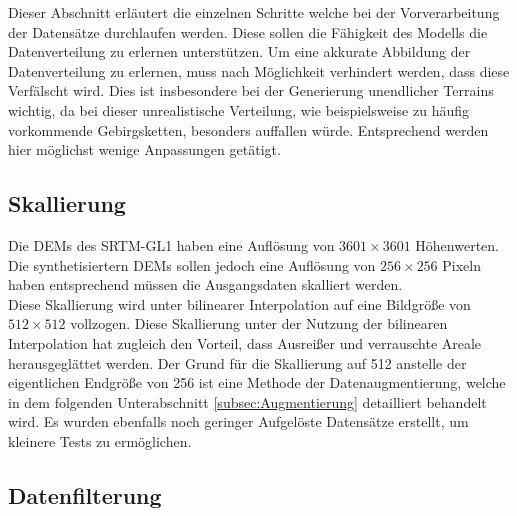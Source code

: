 Dieser Abschnitt erläutert die einzelnen Schritte welche bei der Vorverarbeitung der Datensätze durchlaufen werden. Diese sollen die Fähigkeit des Modells die Datenverteilung zu erlernen unterstützen. Um eine akkurate Abbildung der Datenverteilung zu erlernen, muss nach Möglichkeit verhindert werden, dass diese Verfälscht wird. Dies ist insbesondere bei der Generierung unendlicher Terrains wichtig, da bei dieser unrealistische Verteilung, wie beispielsweise zu häufig vorkommende Gebirgsketten, besonders auffallen würde. Entsprechend werden hier möglichst wenige Anpassungen getätigt.


\subsection{Skallierung}

Die DEMs des SRTM-GL1 haben eine Auflösung von $3601\times3601$ Höhenwerten. Die synthetisiertern DEMs sollen jedoch eine Auflösung von $256\times256$ Pixeln haben entsprechend müssen die Ausgangsdaten skalliert werden. \\ 
Diese Skallierung wird unter bilinearer Interpolation auf eine Bildgröße von $512\times512$ vollzogen. Diese Skallierung unter der Nutzung der bilinearen Interpolation hat zugleich den Vorteil, dass Ausreißer und verrauschte Areale herausgeglättet werden. Der Grund für die Skallierung auf 512 anstelle der eigentlichen Endgröße von 256 ist eine Methode der Datenaugmentierung, welche in dem folgenden Unterabschnitt \ref{subsec:Augmentierung} detailliert behandelt wird. 
Es wurden ebenfalls noch geringer Aufgelöste Datensätze erstellt, um kleinere Tests zu ermöglichen. 

\subsection{Datenfilterung}

